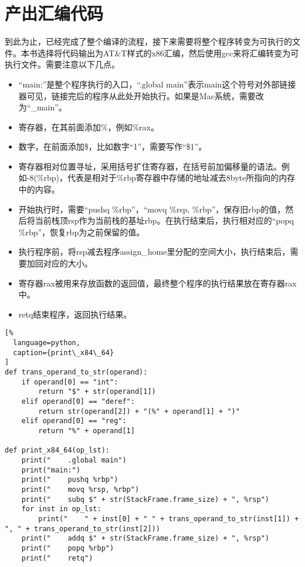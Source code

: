\section{产出汇编代码}

到此为止，已经完成了整个编译的流程，接下来需要将整个程序转变为可执行的文件。本书选择将代码输出为AT\&T样式的x86汇编，然后使用gcc来将汇编转变为可执行文件。需要注意以下几点。

\begin{itemize}
  \item “main:”是整个程序执行的入口，“.global main”表示main这个符号对外部链接器可见，链接完后的程序从此处开始执行。如果是Mac系统，需要改为“\_main”。
  \item 寄存器，在其前面添加\%，例如\%rax。
  \item 数字，在前面添加\$，比如数字“1”，需要写作“\$1”。
  \item 寄存器相对位置寻址，采用括号扩住寄存器，在括号前加偏移量的语法。例如-8(\%rbp)，代表是相对于\%rbp寄存器中存储的地址减去8byte所指向的内存中的内容。
  \item 开始执行时，需要“pushq \%rbp”，“movq \%rsp, \%rbp”，保存旧rbp的值，然后将当前栈顶rsp作为当前栈的基址rbp。在执行结束后，执行相对应的“popq \%rbp”，恢复rbp为之前保留的值。
  \item 执行程序前，将rsp减去程序assign\_home里分配的空间大小，执行结束后，需要加回对应的大小。
  \item 寄存器rax被用来存放函数的返回值，最终整个程序的执行结果放在寄存器rax中。
  \item retq结束程序，返回执行结果。
\end{itemize}


\begin{lstlisting}[%
  language=python,
  caption={print\_x84\_64}
]
def trans_operand_to_str(operand):
    if operand[0] == "int":
        return "$" + str(operand[1])
    elif operand[0] == "deref":
        return str(operand[2]) + "(%" + operand[1] + ")"
    elif operand[0] == "reg":
        return "%" + operand[1]

def print_x84_64(op_lst):
    print("    .global main")
    print("main:")
    print("    pushq %rbp")
    print("    movq %rsp, %rbp")
    print("    subq $" + str(StackFrame.frame_size) + ", %rsp")
    for inst in op_lst:
        print("    " + inst[0] + " " + trans_operand_to_str(inst[1]) + ", " + trans_operand_to_str(inst[2]))
    print("    addq $" + str(StackFrame.frame_size) + ", %rsp")
    print("    popq %rbp")
    print("    retq")
\end{lstlisting}



